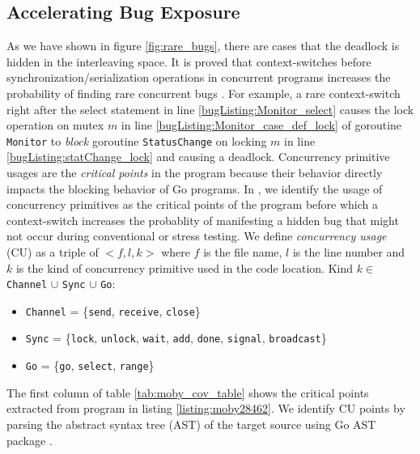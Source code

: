 \subsection{Accelerating Bug Exposure}
\label{sec:critical}
As we have shown in figure \ref{fig:rare_bugs}, there are cases that the deadlock is hidden in the interleaving space.
%
It is proved that context-switches before synchronization/serialization operations in concurrent programs increases the probability of finding rare concurrent bugs \cite{burckhardt-depthBug-asplos10}.
%
For example, a rare context-switch right after the select statement in line \ref{bugListing:Monitor_select} causes the lock operation on mutex $m$ in line \ref{bugListing:Monitor_case_def_lock} of goroutine \texttt{Monitor} to \textit{block} goroutine \texttt{StatusChange} on locking $m$ in line \ref{bugListing:statChange_lock} and causing a deadlock.
%
Concurrency primitive usages are the \textit{critical points} in the program because their behavior directly impacts the blocking behavior of Go programs.
%
In \goat, we identify the usage of concurrency primitives as the critical points of the program before which a context-switch increases the probablity of manifesting a hidden bug that might not occur during conventional or stress testing.
%
%
We define \textit{concurrency usage} (CU) as a triple of $<f,l,k>$ where $f$ is the file name, $l$ is the line number and $k$ is the kind of concurrency primitive used in the code location.
Kind $k\in$ \texttt{Channel} $\cup$ \texttt{Sync} $\cup$ \texttt{Go}:
\begin{itemize}
  \item \texttt{Channel} = \{\texttt{send}, \texttt{receive}, \texttt{close}\}
  \item \texttt{Sync} = \{\texttt{lock}, \texttt{unlock}, \texttt{wait}, \texttt{add}, \texttt{done}, \texttt{signal}, \texttt{broadcast}\}
  \item \texttt{Go} = \{\texttt{go}, \texttt{select}, \texttt{range}\}
\end{itemize}

The first column of table \ref{tab:moby_cov_table} shows the critical points extracted from program in listing \ref{listing:moby28462}.
%
We identify CU points by parsing the abstract syntax tree (AST) of the target source using Go AST package \cite{go-package-ast}.

